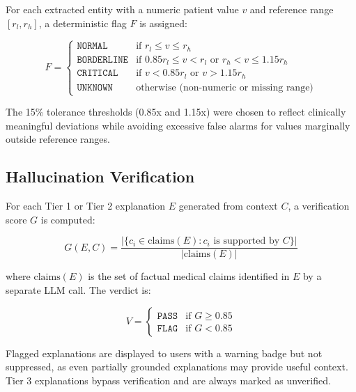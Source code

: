 \documentclass[conference]{IEEEtran}
\begin{document}
For each extracted entity with a numeric patient value $v$ and reference range $[r_l, r_h]$, a deterministic flag $F$ is assigned:

\begin{equation}
F = \begin{cases}
\texttt{NORMAL} & \text{if } r_l \leq v \leq r_h \\
\texttt{BORDERLINE} & \text{if } 0.85 r_l \leq v < r_l \text{ or } r_h < v \leq 1.15 r_h \\
\texttt{CRITICAL} & \text{if } v < 0.85 r_l \text{ or } v > 1.15 r_h \\
\texttt{UNKNOWN} & \text{otherwise (non-numeric or missing range)}
\end{cases}
\end{equation}

The 15\% tolerance thresholds (0.85x and 1.15x) were chosen to reflect clinically meaningful deviations while avoiding excessive false alarms for values marginally outside reference ranges.

\subsection{Hallucination Verification}

For each Tier 1 or Tier 2 explanation $E$ generated from context $C$, a verification score $G$ is computed:

\begin{equation}
G(E, C) = \frac{|\{c_i \in \text{claims}(E) : c_i \text{ is supported by } C\}|}{|\text{claims}(E)|}
\end{equation}

where $\text{claims}(E)$ is the set of factual medical claims identified in $E$ by a separate LLM call. The verdict is:

\begin{equation}
V = \begin{cases}
\texttt{PASS} & \text{if } G \geq 0.85 \\
\texttt{FLAG} & \text{if } G < 0.85
\end{cases}
\end{equation}

Flagged explanations are displayed to users with a warning badge but not suppressed, as even partially grounded explanations may provide useful context. Tier 3 explanations bypass verification and are always marked as unverified.

\end{document}
